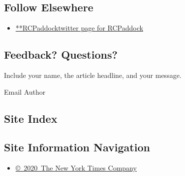 \hypertarget{follow-elsewhere}{%
\subsection{Follow Elsewhere}\label{follow-elsewhere}}

\begin{itemize}
\tightlist
\item
  \href{https://twitter.com/RCPaddock}{**RCPaddocktwitter page for
  RCPaddock}
\end{itemize}

\hypertarget{feedback-questions}{%
\subsection{Feedback? Questions?}\label{feedback-questions}}

Include your name, the article headline, and your message.

Email Author

\hypertarget{site-index}{%
\subsection{Site Index}\label{site-index}}

\hypertarget{site-information-navigation}{%
\subsection{Site Information
Navigation}\label{site-information-navigation}}

\begin{itemize}
\tightlist
\item
  \href{https://help.nytimes3xbfgragh.onion/hc/en-us/articles/115014792127-Copyright-notice}{©~2020~The
  New York Times Company}
\end{itemize}

